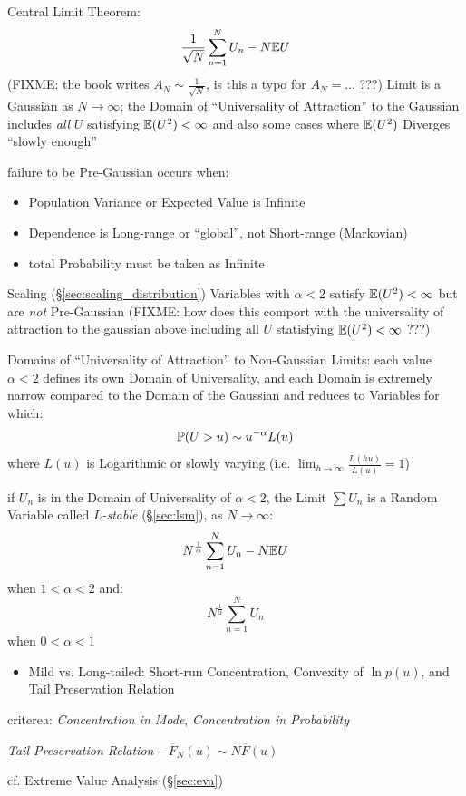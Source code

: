 Central Limit Theorem:
\[
  \frac{1}{\sqrt{N}} \sum_{n=1}^N U_n - N \mathbb{E}{U}
\]
(FIXME: the book writes $A_N \sim \frac{1}{\sqrt{N}}$, is this a typo for
$A_N = ...$ ???)
Limit is a Gaussian as $N \to \infty$; the Domain of ``Universality of
Attraction'' to the Gaussian includes \emph{all} $U$ satisfying $\mathbb{E}(U^2) <
\infty$ and also some cases where $\mathbb{E}(U^2)$ Diverges ``slowly enough''

failure to be Pre-Gaussian occurs when:
\begin{itemize}
  \item Population Variance or Expected Value is Infinite
  \item Dependence is Long-range or ``global'', not Short-range (Markovian)
  \item total Probability must be taken as Infinite
\end{itemize}

Scaling (\S\ref{sec:scaling_distribution}) Variables with $\alpha < 2$ satisfy
$\mathbb{E}(U^2) < \infty$ but are \emph{not} Pre-Gaussian
(FIXME: how does this comport with the universality of attraction to the
gaussian above including all $U$ statisfying $\mathbb{E}(U^2) < \infty$ ???)

Domains of ``Universality of Attraction'' to Non-Gaussian Limits: each value
$\alpha < 2$ defines its own Domain of Universality, and each Domain is
extremely narrow compared to the Domain of the Gaussian and reduces to Variables
for which:
\[
  \mathbb{P}(U > u) \sim u^{-\alpha} L(u)
\]
where $L(u)$ is Logarithmic or slowly varying (i.e.
$\lim_{h \to \infty} \frac{L(hu)}{L(u)} = 1$)

if $U_n$ is in the Domain of Universality of $\alpha < 2$, the Limit $\sum U_n$
is a Random Variable called \emph{$L$-stable} (\S\ref{sec:lsm}), as
$N \to \infty$:
\[
  N^\frac{1}{\alpha} \sum_{n=1}^N U_n - N \mathbb{E}{U}
\]
when $1 < \alpha < 2$ and:
\[
  N^\frac{1}{\alpha} \sum_{n=1}^N U_n
\]
when $0 < \alpha < 1$

\begin{itemize}
  \item Mild vs. Long-tailed: Short-run Concentration, Convexity of $\ln p(u)$,
    and Tail Preservation Relation
\end{itemize}

criterea: \emph{Concentration in Mode}, \emph{Concentration in Probability}

\emph{Tail Preservation Relation} -- $\overline{F}_N(u) \sim N \overline{F}(u)$

cf. Extreme Value Analysis (\S\ref{sec:eva})

